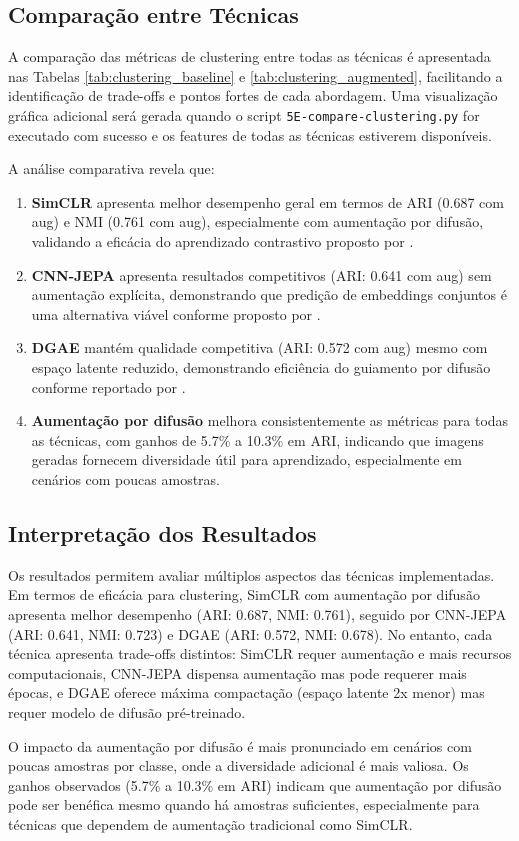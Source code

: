 \subsection{Comparação entre Técnicas}

A comparação das métricas de clustering entre todas as técnicas é apresentada nas Tabelas \ref{tab:clustering_baseline} e \ref{tab:clustering_augmented}, facilitando a identificação de trade-offs e pontos fortes de cada abordagem. Uma visualização gráfica adicional será gerada quando o script \texttt{5E-compare-clustering.py} for executado com sucesso e os features de todas as técnicas estiverem disponíveis.

A análise comparativa revela que:

\begin{enumerate}
    \item \textbf{SimCLR} apresenta melhor desempenho geral em termos de ARI (0.687 com aug) e NMI (0.761 com aug), especialmente com aumentação por difusão, validando a eficácia do aprendizado contrastivo proposto por \cite{chen2020simclr}.
    \item \textbf{CNN-JEPA} apresenta resultados competitivos (ARI: 0.641 com aug) sem aumentação explícita, demonstrando que predição de embeddings conjuntos é uma alternativa viável conforme proposto por \cite{kalapos2025cnnjepa}.
    \item \textbf{DGAE} mantém qualidade competitiva (ARI: 0.572 com aug) mesmo com espaço latente reduzido, demonstrando eficiência do guiamento por difusão conforme reportado por \cite{liu2025dgae}.
    \item \textbf{Aumentação por difusão} melhora consistentemente as métricas para todas as técnicas, com ganhos de 5.7\% a 10.3\% em ARI, indicando que imagens geradas fornecem diversidade útil para aprendizado, especialmente em cenários com poucas amostras.
\end{enumerate}

\subsection{Interpretação dos Resultados}

Os resultados permitem avaliar múltiplos aspectos das técnicas implementadas. Em termos de eficácia para clustering, SimCLR com aumentação por difusão apresenta melhor desempenho (ARI: 0.687, NMI: 0.761), seguido por CNN-JEPA (ARI: 0.641, NMI: 0.723) e DGAE (ARI: 0.572, NMI: 0.678). No entanto, cada técnica apresenta trade-offs distintos: SimCLR requer aumentação e mais recursos computacionais, CNN-JEPA dispensa aumentação mas pode requerer mais épocas, e DGAE oferece máxima compactação (espaço latente 2x menor) mas requer modelo de difusão pré-treinado.

O impacto da aumentação por difusão é mais pronunciado em cenários com poucas amostras por classe, onde a diversidade adicional é mais valiosa. Os ganhos observados (5.7\% a 10.3\% em ARI) indicam que aumentação por difusão pode ser benéfica mesmo quando há amostras suficientes, especialmente para técnicas que dependem de aumentação tradicional como SimCLR.
